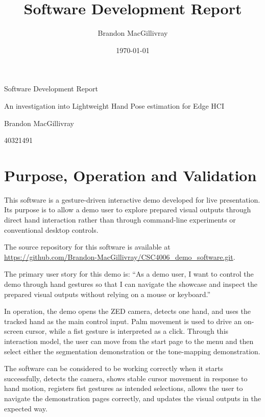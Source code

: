 ﻿\documentclass[11pt,a4paper]{article}
\title{Software Development Report}
\author{Brandon MacGillivray}
\date{\today}
\begin{document}
\hypersetup{pageanchor=false}
\begin{titlepage}
\centering
{\LARGE Software Development Report\par}
\vspace{1.5cm}
{\large An investigation into Lightweight Hand Pose estimation for Edge HCI\par}
\vspace{1cm}
{\large Brandon MacGillivray\par}
\vspace{0.5cm}
{\large 40321491\par}
\vfill
\end{titlepage}
\hypersetup{pageanchor=true}

\tableofcontents
\newpage

\section{Purpose, Operation and Validation}

\noindent This software is a gesture-driven interactive demo developed for live
presentation. Its purpose is to allow a demo user to explore prepared visual
outputs through direct hand interaction rather than through command-line
experiments or conventional desktop controls.

\medskip

\noindent The source repository for this software is available at
\url{https://github.com/Brandon-MacGillivray/CSC4006_demo_software.git}.


\medskip

\noindent The primary user story for this demo is: ``As a demo user, I want to
control the demo through hand gestures so that I can navigate the
showcase and inspect the prepared visual outputs without relying on a mouse or
keyboard.''

\medskip

\noindent In operation, the demo opens the ZED camera, detects one hand, and
uses the tracked hand as the main control input. Palm movement is used to drive
an on-screen cursor, while a fist gesture is interpreted as a click. Through
this interaction model, the user can move from the start page to the menu and
then select either the segmentation demonstration or the tone-mapping
demonstration.

\medskip

\noindent The software can be considered to be working correctly when it starts successfully,
detects the camera, shows stable cursor movement in response to hand motion,
registers fist gestures as intended selections, allows the user to navigate the
demonstration pages correctly, and updates the visual outputs in the expected
way.
\end{document}
